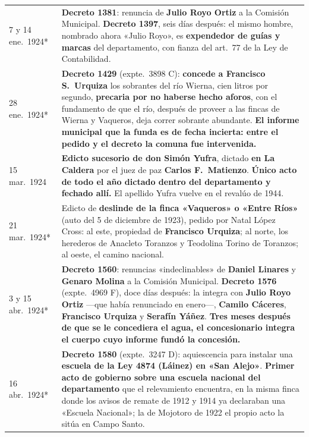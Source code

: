 \begin{longtable}{@{}p{2.7cm}p{10.3cm}@{}}
7 y 14 ene.\ 1924* & \textbf{Decreto 1381}: renuncia de \textbf{Julio Royo Ortiz} a la Comisión Municipal. \textbf{Decreto 1397}, seis días después: el mismo hombre, nombrado ahora «Julio Royo», es \textbf{expendedor de guías y marcas} del departamento, con fianza del art.\ 77 de la Ley de Contabilidad. \\
28 ene.\ 1924* & \textbf{Decreto 1429} (expte.\ 3898 C): \textbf{concede a Francisco S.\ Urquiza}\index{Urquiza, Francisco S.} los sobrantes del río Wierna, cien litros por segundo, \textbf{precaria por no haberse hecho aforos}, con el fundamento de que el río, después de proveer a las fincas de Wierna y Vaqueros, deja correr sobrante abundante. \textbf{El informe municipal que la funda es de fecha incierta: entre el pedido y el decreto la comuna fue intervenida.} \\
15 mar.\ 1924 & \textbf{Edicto sucesorio de don Simón Yufra}, dictado \textbf{en La Caldera} por el juez de paz \textbf{Carlos F.\ Matienzo}\index{Matienzo, Carlos}. \textbf{Único acto de todo el año dictado dentro del departamento y fechado allí.} El apellido Yufra vuelve en el revalúo de 1944. \\
21 mar.\ 1924* & Edicto de \textbf{deslinde de la finca «Vaqueros» o «Entre Ríos»} (auto del 5 de diciembre de 1923), pedido por Natal López Cross: al este, propiedad de \textbf{Francisco Urquiza}\index{Urquiza, Francisco S.}; al norte, los herederos de Anacleto Toranzos y Teodolina Torino de Toranzos; al oeste, el camino nacional. \\
3 y 15 abr.\ 1924* & \textbf{Decreto 1560}: renuncias «indeclinables» de \textbf{Daniel Linares}\index{Linares, Daniel} y \textbf{Genaro Molina} a la Comisión Municipal. \textbf{Decreto 1576} (expte.\ 4969 F), doce días después: la integra con \textbf{Julio Royo Ortiz} ---que había renunciado en enero---, \textbf{Camilo Cáceres}, \textbf{Francisco Urquiza}\index{Urquiza, Francisco S.} y \textbf{Serafín Yáñez}. \textbf{Tres meses después de que se le concediera el agua, el concesionario integra el cuerpo cuyo informe fundó la concesión.} \\
16 abr.\ 1924* & \textbf{Decreto 1580} (expte.\ 3247 D): aquiescencia para instalar una \textbf{escuela de la Ley 4874 (Láinez) en «San Alejo»}. \textbf{Primer acto de gobierno sobre una escuela nacional del departamento} que el relevamiento encuentra, en la misma finca donde los avisos de remate de 1912 y 1914 ya declaraban una «Escuela Nacional»; la de Mojotoro de 1922 el propio acto la sitúa en Campo Santo. \\

\end{longtable}
